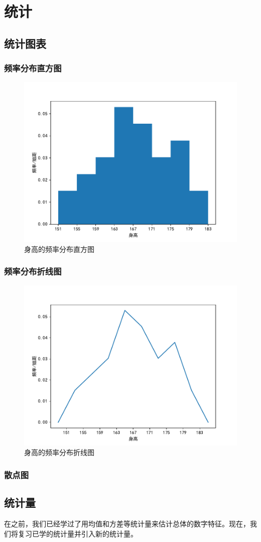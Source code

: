 \chapter{统计}

\section{统计图表}
\subsection{频率分布直方图}
\begin{figure}[htb]
	\centering
	\includegraphics[width=0.5\linewidth]{src/images/chart1.pdf}
	\caption{身高的频率分布直方图}
	\label{fig:histogram}
\end{figure}

\subsection{频率分布折线图}
\begin{figure}[htb]
	\centering
	\includegraphics[width=0.5\linewidth]{src/images/chart2.pdf}
	\caption{身高的频率分布折线图}
	\label{fig:line-chart}
\end{figure}

\subsection{散点图}

\section{统计量}
在之前，我们已经学过了用均值和方差等统计量来估计总体的数字特征。现在，我们将复习已学的统计量并引入新的统计量。

